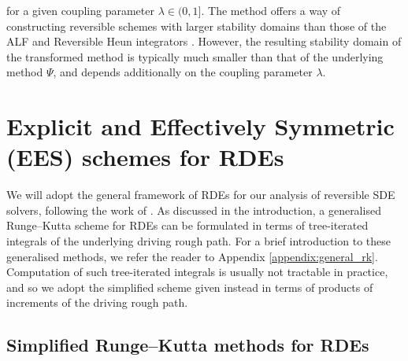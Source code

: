 \documentclass{article} %
\theoremstyle{definition}
\theoremstyle{remark}
\begin{document}
for a given coupling parameter $\lambda \in (0,1]$. The method offers a way of constructing reversible schemes with larger stability domains than those of the ALF and Reversible Heun integrators \cite[Theorem 2.3]{mccallum2024efficient}. However, the resulting stability domain of the transformed method is typically much smaller than that of the underlying method $\Psi$, and depends additionally on the coupling parameter $\lambda$.




\section{Explicit and Effectively Symmetric (EES) schemes for RDEs}\label{sec:ees}


We will adopt the general framework of RDEs for our analysis of reversible SDE solvers, following the work of \citet{redmann2020runge}. As discussed in the introduction, a generalised Runge--Kutta scheme for RDEs can be formulated in terms of tree-iterated integrals of the underlying driving rough path. For a brief introduction to these generalised methods, we refer the reader to Appendix \ref{appendix:general_rk}. Computation of such tree-iterated integrals is usually not tractable in practice, and so we adopt the simplified scheme given instead in terms of products of increments of the driving rough path.

\subsection{Simplified Runge--Kutta methods for RDEs}
\end{document}
